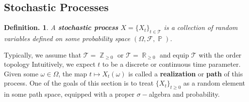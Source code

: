 \documentclass[11pt, a4paper]{memoir}
\DeclareMathOperator{\Z}{{\mathbb{Z}}}
\DeclareMathOperator{\R}{{\mathbb{R}}}
\theoremstyle{change}
\theoremstyle{plain}
\theoremstyle{nonumberplain}
\newtheorem{definition}{Definition.}
\DeclareMathOperator{\pr}{{\mathbb{P}}}
\newcommand{\defn}[1]{{\boldmath\bfseries #1}}
\numberwithin{equation}{section}
\begin{document}
\subsection{Stochastic Processes}
\begin{definition}
    A \defn{stochastic process} $X=\{X_t\}_{t\in \mathcal{T}}$ is a collection of random variables defined on some probability space $(\Omega,\mathcal{F},\pr)$.
\end{definition}
Typically, we assume that $\mathcal{T}=\Z_{\geq 0}$ or $\mathcal{T}=\R_{\geq 0}$ and equip $\mathcal{T}$ with the order topology
Intuitively, we expect $t$ to be a discrete or continuous time parameter.
Given some $\omega\in\Omega$, the map $t\mapsto X_t(\omega)$ is called a \defn{realization} or \defn{path} of this process.
One of the goals of this section is to treat $\{X_t\}_{t\geq 0}$ as a random element in some path space, equipped with a proper $\sigma-$algebra and probability.
\end{document}
